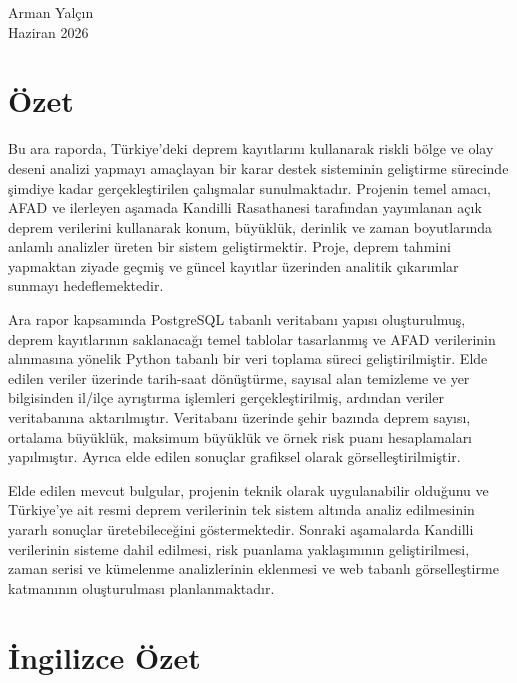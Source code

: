 \documentclass[12pt,a4paper]{report}
\begin{document}
\vspace{1cm}
\begin{flushright}
Arman Yalçın\\
Haziran 2026
\end{flushright}

\clearpage

\chapter*{Özet}

Bu ara raporda, Türkiye'deki deprem kayıtlarını kullanarak riskli bölge ve olay deseni
analizi yapmayı amaçlayan bir karar destek sisteminin geliştirme sürecinde şimdiye kadar
gerçekleştirilen çalışmalar sunulmaktadır. Projenin temel amacı, AFAD ve ilerleyen aşamada
Kandilli Rasathanesi tarafından yayımlanan açık deprem verilerini kullanarak konum,
büyüklük, derinlik ve zaman boyutlarında anlamlı analizler üreten bir sistem geliştirmektir.
Proje, deprem tahmini yapmaktan ziyade geçmiş ve güncel kayıtlar üzerinden analitik
çıkarımlar sunmayı hedeflemektedir.

Ara rapor kapsamında PostgreSQL tabanlı veritabanı yapısı oluşturulmuş, deprem kayıtlarının
saklanacağı temel tablolar tasarlanmış ve AFAD verilerinin alınmasına yönelik Python tabanlı
bir veri toplama süreci geliştirilmiştir. Elde edilen veriler üzerinde tarih-saat dönüştürme,
sayısal alan temizleme ve yer bilgisinden il/ilçe ayrıştırma işlemleri gerçekleştirilmiş,
ardından veriler veritabanına aktarılmıştır. Veritabanı üzerinde şehir bazında deprem sayısı,
ortalama büyüklük, maksimum büyüklük ve örnek risk puanı hesaplamaları yapılmıştır.
Ayrıca elde edilen sonuçlar grafiksel olarak görselleştirilmiştir.

Elde edilen mevcut bulgular, projenin teknik olarak uygulanabilir olduğunu ve Türkiye'ye ait
resmi deprem verilerinin tek sistem altında analiz edilmesinin yararlı sonuçlar üretebileceğini
göstermektedir. Sonraki aşamalarda Kandilli verilerinin sisteme dahil edilmesi, risk puanlama
yaklaşımının geliştirilmesi, zaman serisi ve kümelenme analizlerinin eklenmesi ve web tabanlı
görselleştirme katmanının oluşturulması planlanmaktadır.

\clearpage

\chapter*{İngilizce Özet}
\end{document}
